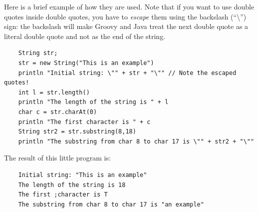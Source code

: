 Here is a brief example of how they are used. Note that if you want to
use double quotes inside double quotes, you have to \emph{escape} them
using the backslash (``\textbackslash'') sign: the backslash will make
Groovy and Java treat the next double quote as a literal double quote
and not as the end of the string. 

\begin{verbatim}
    String str;
    str = new String("This is an example")
    println "Initial string: \"" + str + "\"" // Note the escaped quotes!
    int l = str.length()
    println "The length of the string is " + l
    char c = str.charAt(0)
    println "The first character is " + c
    String str2 = str.substring(8,18)
    println "The substring from char 8 to char 17 is \"" + str2 + "\""
\end{verbatim}

The result of this little program is:

\begin{verbatim}
    Initial string: "This is an example"
    The length of the string is 18
    The first ;character is T
    The substring from char 8 to char 17 is "an example"
\end{verbatim}







